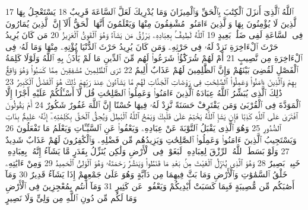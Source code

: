 {\tiny\colorbox{cl_aya}{17}} ٱللَّهُ ٱلَّذِىٓ أَنزَلَ ٱلْكِتَٰبَ بِٱلْحَقِّ وَٱلْمِيزَانَ وَمَا يُدْرِيكَ لَعَلَّ ٱلسَّاعَةَ قَرِيبٌ
{\tiny\colorbox{cl_aya}{18}} يَسْتَعْجِلُ بِهَا ٱلَّذِينَ لَا يُؤْمِنُونَ بِهَا وَٱلَّذِينَ ءَامَنُوا۟ مُشْفِقُونَ مِنْهَا وَيَعْلَمُونَ أَنَّهَا ٱلْحَقُّ أَلَآ إِنَّ ٱلَّذِينَ يُمَارُونَ فِى ٱلسَّاعَةِ لَفِى ضَلَٰلٍۭ بَعِيدٍ
{\tiny\colorbox{cl_aya}{19}} ٱللَّهُ لَطِيفٌۢ بِعِبَادِهِۦ يَرْزُقُ مَن يَشَآءُ وَهُوَ ٱلْقَوِىُّ ٱلْعَزِيزُ
{\tiny\colorbox{cl_aya}{20}} مَن كَانَ يُرِيدُ حَرْثَ ٱلْءَاخِرَةِ نَزِدْ لَهُۥ فِى حَرْثِهِۦ وَمَن كَانَ يُرِيدُ حَرْثَ ٱلدُّنْيَا نُؤْتِهِۦ مِنْهَا وَمَا لَهُۥ فِى ٱلْءَاخِرَةِ مِن نَّصِيبٍ
{\tiny\colorbox{cl_aya}{21}} أَمْ لَهُمْ شُرَكَٰٓؤُا۟ شَرَعُوا۟ لَهُم مِّنَ ٱلدِّينِ مَا لَمْ يَأْذَنۢ بِهِ ٱللَّهُ وَلَوْلَا كَلِمَةُ ٱلْفَصْلِ لَقُضِىَ بَيْنَهُمْ وَإِنَّ ٱلظَّٰلِمِينَ لَهُمْ عَذَابٌ أَلِيمٌ
{\tiny\colorbox{cl_aya}{22}} تَرَى ٱلظَّٰلِمِينَ مُشْفِقِينَ مِمَّا كَسَبُوا۟ وَهُوَ وَاقِعٌۢ بِهِمْ وَٱلَّذِينَ ءَامَنُوا۟ وَعَمِلُوا۟ ٱلصَّٰلِحَٰتِ فِى رَوْضَاتِ ٱلْجَنَّاتِ لَهُم مَّا يَشَآءُونَ عِندَ رَبِّهِمْ ذَٰلِكَ هُوَ ٱلْفَضْلُ ٱلْكَبِيرُ
{\tiny\colorbox{cl_aya}{23}} ذَٰلِكَ ٱلَّذِى يُبَشِّرُ ٱللَّهُ عِبَادَهُ ٱلَّذِينَ ءَامَنُوا۟ وَعَمِلُوا۟ ٱلصَّٰلِحَٰتِ قُل لَّآ أَسْـَٔلُكُمْ عَلَيْهِ أَجْرًا إِلَّا ٱلْمَوَدَّةَ فِى ٱلْقُرْبَىٰ وَمَن يَقْتَرِفْ حَسَنَةً نَّزِدْ لَهُۥ فِيهَا حُسْنًا إِنَّ ٱللَّهَ غَفُورٌ شَكُورٌ
{\tiny\colorbox{cl_aya}{24}} أَمْ يَقُولُونَ ٱفْتَرَىٰ عَلَى ٱللَّهِ كَذِبًا فَإِن يَشَإِ ٱللَّهُ يَخْتِمْ عَلَىٰ قَلْبِكَ وَيَمْحُ ٱللَّهُ ٱلْبَٰطِلَ وَيُحِقُّ ٱلْحَقَّ بِكَلِمَٰتِهِۦٓ إِنَّهُۥ عَلِيمٌۢ بِذَاتِ ٱلصُّدُورِ
{\tiny\colorbox{cl_aya}{25}} وَهُوَ ٱلَّذِى يَقْبَلُ ٱلتَّوْبَةَ عَنْ عِبَادِهِۦ وَيَعْفُوا۟ عَنِ ٱلسَّيِّـَٔاتِ وَيَعْلَمُ مَا تَفْعَلُونَ
{\tiny\colorbox{cl_aya}{26}} وَيَسْتَجِيبُ ٱلَّذِينَ ءَامَنُوا۟ وَعَمِلُوا۟ ٱلصَّٰلِحَٰتِ وَيَزِيدُهُم مِّن فَضْلِهِۦ وَٱلْكَٰفِرُونَ لَهُمْ عَذَابٌ شَدِيدٌ
{\tiny\colorbox{cl_aya}{27}} وَلَوْ بَسَطَ ٱللَّهُ ٱلرِّزْقَ لِعِبَادِهِۦ لَبَغَوْا۟ فِى ٱلْأَرْضِ وَلَٰكِن يُنَزِّلُ بِقَدَرٍ مَّا يَشَآءُ إِنَّهُۥ بِعِبَادِهِۦ خَبِيرٌۢ بَصِيرٌ
{\tiny\colorbox{cl_aya}{28}} وَهُوَ ٱلَّذِى يُنَزِّلُ ٱلْغَيْثَ مِنۢ بَعْدِ مَا قَنَطُوا۟ وَيَنشُرُ رَحْمَتَهُۥ وَهُوَ ٱلْوَلِىُّ ٱلْحَمِيدُ
{\tiny\colorbox{cl_aya}{29}} وَمِنْ ءَايَٰتِهِۦ خَلْقُ ٱلسَّمَٰوَٰتِ وَٱلْأَرْضِ وَمَا بَثَّ فِيهِمَا مِن دَآبَّةٍ وَهُوَ عَلَىٰ جَمْعِهِمْ إِذَا يَشَآءُ قَدِيرٌ
{\tiny\colorbox{cl_aya}{30}} وَمَآ أَصَٰبَكُم مِّن مُّصِيبَةٍ فَبِمَا كَسَبَتْ أَيْدِيكُمْ وَيَعْفُوا۟ عَن كَثِيرٍ
{\tiny\colorbox{cl_aya}{31}} وَمَآ أَنتُم بِمُعْجِزِينَ فِى ٱلْأَرْضِ وَمَا لَكُم مِّن دُونِ ٱللَّهِ مِن وَلِىٍّ وَلَا نَصِيرٍ
